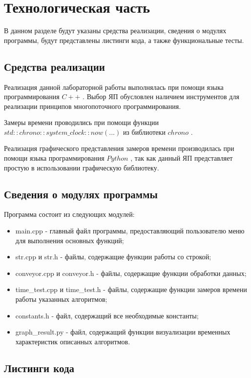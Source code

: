 \chapter{Технологическая часть}

В данном разделе будут указаны средства реализации, сведения о модулях программы, будут представлены листинги кода, а также функциональные тесты.

\section{Средства реализации}

Реализация данной лабораторной работы выполнялась при помощи языка программирования $C++$ \cite{c++}. Выбор ЯП обусловлен наличием инструментов для реализации принципов многопоточного программирования.

Замеры времени проводились при помощи функции $std::chrono::system\_clock::now(...)$ из библиотеки $chrono$ \cite{time}.

Реализация графического представления замеров времени производилась при помощи языка программирования $Python$ \cite{python}, так как данный ЯП представляет простую в использовании графическую библиотеку.

\section{Сведения о модулях программы}

Программа состоит из следующих модулей:

\begin{itemize}
	\item main.cpp - главный файл программы, предоставляющий пользователю меню для выполнения основных функций;
	\item str.cpp и str.h - файлы, содержащие функции работы со строкой;
	\item conveyor.cpp и conveyor.h - файлы, содержащие функции обработки данных;
	\item time\_test.cpp и time\_test.h - файлы, содержащие функции замеров времени работы указанных алгоритмов;
	\item constants.h - файл, содержащий все необходимые константы;
	\item graph\_result.py - файл, содержащий функции визуализации временных характеристик описанных алгоритмов.
\end{itemize}

\section{Листинги кода}

